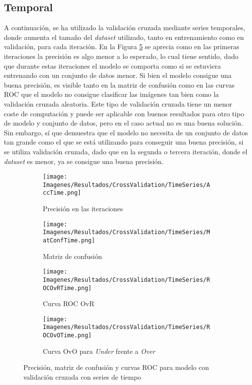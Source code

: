 \documentclass{report}
\begin{document}
\vspace{0.5cm}
\subsection{Temporal}

A continuación, se ha utilizado la validación cruzada mediante series temporales, donde aumenta el tamaño del \textit{dataset} utilizado, tanto en entrenamiento como en validación, para cada iteración. En la Figura \ref{fig:CVTime} se aprecia como en las primeras iteraciones la precisión es algo menor a lo esperado, lo cual tiene sentido, dado que durante estas iteraciones el modelo se comporta como si se estuviera entrenando con un conjunto de datos menor. Si bien el modelo consigue una buena precisión, es visible tanto en la matriz de confusión como en las curvas ROC que el modelo no consigue clasificar las imágenes tan bien como la validación cruzada aleatoria. Este tipo de validación cruzada tiene un menor coste de computación y puede ser aplicable con buenos resultados para otro tipo de modelo y conjunto de datos, pero en el caso actual no es una buena solución. Sin embargo, sí que demuestra que el modelo no necesita de un conjunto de datos tan grande como el que se está utilizando para conseguir una buena precisión, si se utiliza validación cruzada, dado que en la segunda o tercera iteración, donde el \textit{dataset} es menor, ya se consigue una buena precisión. 


\vspace{0.4cm}
\begin{figure}[H]
	 	\centering
            \begin{subfigure}[b]{0.45\linewidth}
	 	\centering
	 		\texttt{[image: Imagenes/Resultados/CrossValidation/TimeSeries/AccTime.png]}
	 		\caption{ Precisión en las iteraciones }
                    \label{fig:CVTimeAcc}
	 	\end{subfigure}
	 	\begin{subfigure}[b]{0.45\linewidth}
	 	\centering
	 		\texttt{[image: Imagenes/Resultados/CrossValidation/TimeSeries/MatConfTime.png]}
	 		\caption{ Matriz de confusión }
                    \label{fig:CVTimeMatConf}
	 	\end{subfigure}
	 	\begin{subfigure}[b]{0.45\linewidth}
	 	\centering
	 		\texttt{[image: Imagenes/Resultados/CrossValidation/TimeSeries/ROCOvRTime.png]}
                    \caption{ Curva ROC OvR}
                    \label{fig:CVTimeROCOvR}
	 	\end{subfigure}
            \begin{subfigure}[b]{0.45\linewidth}
	 	\centering
	 		\texttt{[image: Imagenes/Resultados/CrossValidation/TimeSeries/ROCOvOTime.png]}
                    \caption{ Curva OvO para \textit{Under} frente a \textit{Over} }
                    \label{fig:CVTimeROCOvO}
	 	\end{subfigure}
	 	\caption{ Precisión, matriz de confusión y curvas ROC para modelo con validación cruzada con series de tiempo }
	 	\label{fig:CVTime}
\end{figure}
\end{document}
